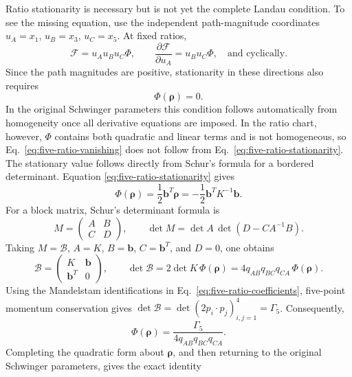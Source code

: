 \documentclass[a4paper,11pt]{article}
\begin{document}
Ratio stationarity is necessary but is not yet the complete Landau
condition.  To see the missing equation, use the independent path-magnitude
coordinates \(u_A=x_1\), \(u_B=x_3\), \(u_C=x_5\).  At fixed ratios,
\begin{equation}
 \mathcal F=u_Au_Bu_C\Phi,
 \qquad
 \frac{\partial\mathcal F}{\partial u_A}
 =u_Bu_C\Phi,
 \quad\text{and cyclically}.
 \label{eq:five-path-magnitude-equations}
\end{equation}
Since the path magnitudes are positive, stationarity in these directions
also requires
\begin{equation}
 \Phi(\boldsymbol\rho)=0.
 \label{eq:five-ratio-vanishing}
\end{equation}
In the original Schwinger parameters this condition follows automatically
from homogeneity once all derivative equations are imposed.  In the ratio
chart, however, \(\Phi\) contains both quadratic and linear terms and is not
homogeneous, so Eq.~\eqref{eq:five-ratio-vanishing} does not follow from
Eq.~\eqref{eq:five-ratio-stationarity}.  The stationary value follows
directly from Schur's formula for a bordered determinant.  Equation
\eqref{eq:five-ratio-stationarity} gives
\[
 \Phi(\boldsymbol\rho)
 =\frac12\boldsymbol b^T\boldsymbol\rho
 =-\frac12\boldsymbol b^TK^{-1}\boldsymbol b.
\]
For a block matrix, Schur's determinant formula is
\cite{Zhang:2005SchurComplement}
\[
 M=\begin{pmatrix}A&B\\ C&D\end{pmatrix},
 \qquad
 \det M=\det A\,\det\!\left(D-CA^{-1}B\right).
\]
Taking
\(M=\mathcal B\), \(A=K\), \(B=\boldsymbol b\),
\(C=\boldsymbol b^T\), and \(D=0\), one obtains
\[
 \mathcal B=\begin{pmatrix}K&\boldsymbol b\\
                  \boldsymbol b^T&0\end{pmatrix},
 \qquad
 \det\mathcal B
 =2\det K\,\Phi(\boldsymbol\rho)
 =4q_{AB}q_{BC}q_{CA}\,\Phi(\boldsymbol\rho).
\]
Using the Mandelstam identifications in
Eq.~\eqref{eq:five-ratio-coefficients}, five-point momentum conservation
gives
\(\det\mathcal B=\det(2p_i\!\cdot p_j)_{i,j=1}^{4}=\Gamma_5\).
Consequently,
\begin{equation}
 \Phi(\boldsymbol\rho)=
 \frac{\Gamma_5}{4q_{AB}q_{BC}q_{CA}}.
 \label{eq:five-stationary-gram}
\end{equation}
Completing the quadratic form about \(\boldsymbol\rho\), and then returning
to the original Schwinger parameters, gives the exact identity
\end{document}
